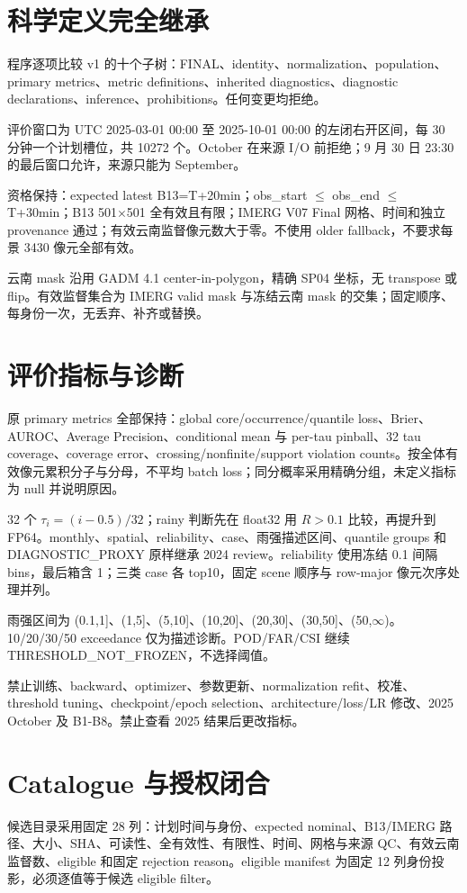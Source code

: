 \documentclass[11pt,a4paper]{ctexart}
\begin{document}
\newpage
\section*{科学定义完全继承}
程序逐项比较 v1 的十个子树：FINAL、identity、normalization、population、primary metrics、metric definitions、inherited diagnostics、diagnostic declarations、inference、prohibitions。任何变更均拒绝。

评价窗口为 UTC 2025-03-01 00:00 至 2025-10-01 00:00 的左闭右开区间，每 30 分钟一个计划槽位，共 10272 个。October 在来源 I/O 前拒绝；9 月 30 日 23:30 的最后窗口允许，来源只能为 September。

资格保持：expected latest B13=T+20min；obs\_start $\leq$ obs\_end $\leq$ T+30min；B13 501$\times$501 全有效且有限；IMERG V07 Final 网格、时间和独立 provenance 通过；有效云南监督像元数大于零。不使用 older fallback，不要求每景 3430 像元全部有效。

云南 mask 沿用 GADM 4.1 center-in-polygon，精确 SP04 坐标，无 transpose 或 flip。有效监督集合为 IMERG valid mask 与冻结云南 mask 的交集；固定顺序、每身份一次，无丢弃、补齐或替换。

\section*{评价指标与诊断}
原 primary metrics 全部保持：global core/occurrence/quantile loss、Brier、AUROC、Average Precision、conditional mean 与 per-tau pinball、32 tau coverage、coverage error、crossing/nonfinite/support violation counts。按全体有效像元累积分子与分母，不平均 batch loss；同分概率采用精确分组，未定义指标为 null 并说明原因。

32 个 $\tau_i=(i-0.5)/32$；rainy 判断先在 float32 用 $R>0.1$ 比较，再提升到 FP64。monthly、spatial、reliability、case、雨强描述区间、quantile groups 和 DIAGNOSTIC\_PROXY 原样继承 2024 review。reliability 使用冻结 0.1 间隔 bins，最后箱含 1；三类 case 各 top10，固定 scene 顺序与 row-major 像元次序处理并列。

雨强区间为 (0.1,1]、(1,5]、(5,10]、(10,20]、(20,30]、(30,50]、(50,$\infty$)。10/20/30/50 exceedance 仅为描述诊断。POD/FAR/CSI 继续 THRESHOLD\_NOT\_FROZEN，不选择阈值。

禁止训练、backward、optimizer、参数更新、normalization refit、校准、threshold tuning、checkpoint/epoch selection、architecture/loss/LR 修改、2025 October 及 B1-B8。禁止查看 2025 结果后更改指标。

\newpage
\section*{Catalogue 与授权闭合}
候选目录采用固定 28 列：计划时间与身份、expected nominal、B13/IMERG 路径、大小、SHA、可读性、全有效性、有限性、时间、网格与来源 QC、有效云南监督数、eligible 和固定 rejection reason。eligible manifest 为固定 12 列身份投影，必须逐值等于候选 eligible filter。
\end{document}
